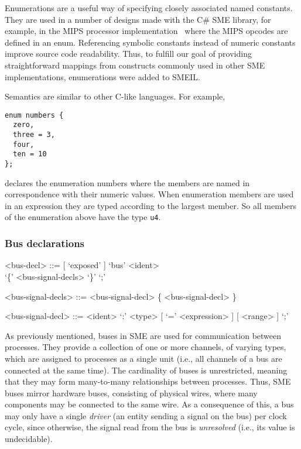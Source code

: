 Enumerations are a useful way of specifying closely associated named
constants. They are used in a number of designs made with the C\# SME library,
for example, in the MIPS processor implementation~\cite{johnsen2017thesis} where
the MIPS opcodes are defined in an {\ttfamily enum}. Referencing symbolic
constants instead of numeric constants improve source code readability. Thus,
to fulfill our goal of providing straightforward mappings from constructs
commonly used in other SME implementations, enumerations were added to SMEIL.


Semantics are similar to other C-like languages. For example,
\begin{lstlisting}[language=smeil]
enum numbers {
  zero,
  three = 3,
  four,
  ten = 10
};
\end{lstlisting}
declares the enumeration {\ttfamily numbers} where the members are named in
correspondence with their numeric values. When enumeration members are used in
an expression they are typed according to the largest member. So all members of
the enumeration above have the type {\tt u4}.


\subsubsection{Bus declarations}

\begin{grammar}
<bus-decl> ::= [ `exposed' ] `bus' <ident> \\ `\{' <bus-signal-decls> `\}'  `;'


<bus-signal-decls> ::= <bus-signal-decl> \{ <bus-signal-decl> \}

<bus-signal-decl> ::= <ident> `:' <type> [ `=' <expression> ] [ <range> ] `;'
\end{grammar}
\enlargethispage{2em}

As previously mentioned, buses in SME are used for communication between
processes. They provide a collection of one or more channels, of varying types,
which are assigned to processes as a single unit (i.e., all channels of a bus
are connected at the same time). The cardinality of buses is unrestricted,
meaning that they may form many-to-many relationships between processes. Thus,
SME buses mirror hardware buses, consisting of physical wires, where many
components may be connected to the same wire. As a consequence of this, a bus
may only have a single {\itshape driver} (an entity sending a signal on the bus)
per clock cycle, since otherwise, the signal read from the bus is {\itshape
  unresolved} (i.e., its value is undecidable).

